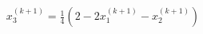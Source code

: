 \documentclass[preview]{standalone}
\begin{document}
\begin{align*}
x_3^{(k+1)} = \frac{1}{4} \left( 2 - 2x_1^{(k+1)} - x_2^{(k+1)} \right)
\end{align*}
\end{document}
